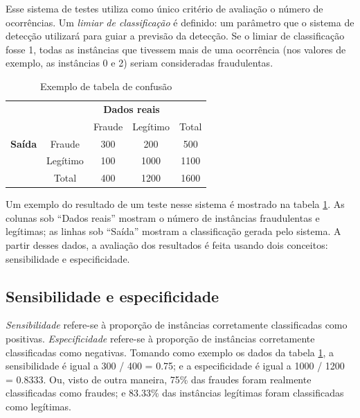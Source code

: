 Esse sistema de testes utiliza como único critério de avaliação o número de ocorrências. Um \emph{limiar de classificação} é definido: um parâmetro que o sistema de detecção utilizará para guiar a previsão da detecção. Se o limiar de classificação fosse 1, todas as instâncias que tivessem mais de uma ocorrência (nos valores de exemplo, as instâncias 0 e 2) seriam consideradas fraudulentas.

\vspace{0.5cm}
\renewcommand{\arraystretch}{1.5}
\begin{table}[h]
    \centering
    \caption{Exemplo de tabela de confusão}
    \label{fraud:ex}
    \vspace{0.5cm}
    \begin{tabular}{c l c c c}
        & & \multicolumn{2}{c}{\textbf{Dados reais}} \\
        \multirow{3}{5mm}{\begin{sideways}\parbox{20mm}{\textbf{Saída}}\end{sideways}} & \multicolumn{1}{c|}{} & Fraude & Legítimo & \multicolumn{1}{|c}{Total} \\
        \cline{2-5}
        & \multicolumn{1}{c|}{Fraude}   & 300 & 200   & \multicolumn{1}{|c}{500}  \\
        & \multicolumn{1}{c|}{Legítimo} & 100 & 1000  & \multicolumn{1}{|c}{1100} \\
        \cline{2-5}
        & \multicolumn{1}{c|}{Total}    & 400 & 1200  & \multicolumn{1}{|c}{1600} \\
    \end{tabular}
\end{table}
\vspace{0.5cm}

Um exemplo do resultado de um teste nesse sistema é mostrado na tabela \ref{fraud:ex}. As colunas sob ``Dados reais'' mostram o número de instâncias fraudulentas e legítimas; as linhas sob ``Saída'' mostram a classificação gerada pelo sistema. A partir desses dados, a avaliação dos resultados é feita usando dois conceitos: sensibilidade e especificidade.

\subsection{Sensibilidade e especificidade}

\emph{Sensibilidade} refere-se à proporção de instâncias corretamente classificadas como positivas. \emph{Especificidade} refere-se à proporção de instâncias corretamente classificadas como negativas. Tomando como exemplo os dados da tabela \ref{fraud:ex}, a sensibilidade é igual a 300 / 400 = 0.75; e a especificidade é igual a 1000 / 1200 = 0.8333. Ou, visto de outra maneira, 75\% das fraudes foram realmente classificadas como fraudes; e 83.33\% das instâncias legítimas foram classificadas como legítimas.

